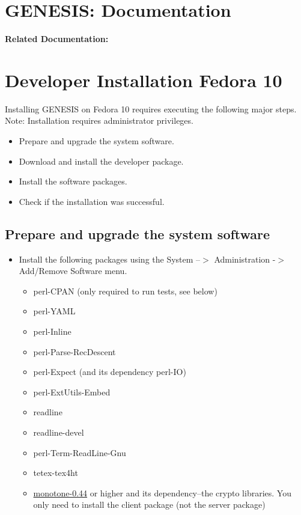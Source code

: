 \documentclass[12pt]{article}
\begin{document}
\section*{GENESIS: Documentation}

{\bf Related Documentation:}

\section*{Developer Installation Fedora 10}

Installing GENESIS on Fedora 10 requires executing the following major steps. Note: Installation requires administrator privileges.
\begin{itemize}
   \item[] Prepare and upgrade the system software.
   \item[] Download and install the developer package.
   \item[] Install the software packages.
   \item[] Check if the installation was successful. 
\end{itemize}

\subsection*{Prepare and upgrade the system software}

\begin{itemize}
   \item[] Install the following packages using the System --$>$ Administration -$>$ Add/Remove Software menu.
      \begin{itemize}
         \item perl-CPAN (only required to run tests, see below)
         \item perl-YAML
         \item perl-Inline
         \item perl-Parse-RecDescent
         \item perl-Expect (and its dependency perl-IO)
         \item perl-ExtUtils-Embed
         \item readline
         \item readline-devel
         \item perl-Term-ReadLine-Gnu
         \item tetex-tex4ht
         \item \href{http://monotone.ca/}{monotone-0.44} or higher and its dependency--the crypto libraries. You only need to install the client package (not the server package) 
      \end{itemize}
 \end{itemize}
\end{document}
